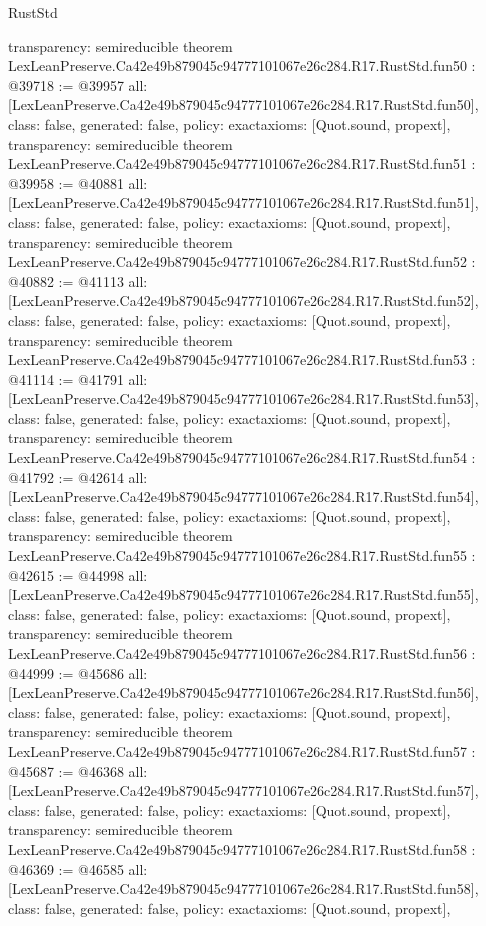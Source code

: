 \begin{lexlean}{RustStd}
\begin{coremodule}
{  transparency: semireducible
}
theorem LexLeanPreserve.Ca42e49b879045c94777101067e26c284.R17.RustStd.fun50 : @39718 := @39957 {
  all: [LexLeanPreserve.Ca42e49b879045c94777101067e26c284.R17.RustStd.fun50],
  class: false,
  generated: false,
  policy: exact{axioms: [Quot.sound, propext]},
  transparency: semireducible
}
theorem LexLeanPreserve.Ca42e49b879045c94777101067e26c284.R17.RustStd.fun51 : @39958 := @40881 {
  all: [LexLeanPreserve.Ca42e49b879045c94777101067e26c284.R17.RustStd.fun51],
  class: false,
  generated: false,
  policy: exact{axioms: [Quot.sound, propext]},
  transparency: semireducible
}
theorem LexLeanPreserve.Ca42e49b879045c94777101067e26c284.R17.RustStd.fun52 : @40882 := @41113 {
  all: [LexLeanPreserve.Ca42e49b879045c94777101067e26c284.R17.RustStd.fun52],
  class: false,
  generated: false,
  policy: exact{axioms: [Quot.sound, propext]},
  transparency: semireducible
}
theorem LexLeanPreserve.Ca42e49b879045c94777101067e26c284.R17.RustStd.fun53 : @41114 := @41791 {
  all: [LexLeanPreserve.Ca42e49b879045c94777101067e26c284.R17.RustStd.fun53],
  class: false,
  generated: false,
  policy: exact{axioms: [Quot.sound, propext]},
  transparency: semireducible
}
theorem LexLeanPreserve.Ca42e49b879045c94777101067e26c284.R17.RustStd.fun54 : @41792 := @42614 {
  all: [LexLeanPreserve.Ca42e49b879045c94777101067e26c284.R17.RustStd.fun54],
  class: false,
  generated: false,
  policy: exact{axioms: [Quot.sound, propext]},
  transparency: semireducible
}
theorem LexLeanPreserve.Ca42e49b879045c94777101067e26c284.R17.RustStd.fun55 : @42615 := @44998 {
  all: [LexLeanPreserve.Ca42e49b879045c94777101067e26c284.R17.RustStd.fun55],
  class: false,
  generated: false,
  policy: exact{axioms: [Quot.sound, propext]},
  transparency: semireducible
}
theorem LexLeanPreserve.Ca42e49b879045c94777101067e26c284.R17.RustStd.fun56 : @44999 := @45686 {
  all: [LexLeanPreserve.Ca42e49b879045c94777101067e26c284.R17.RustStd.fun56],
  class: false,
  generated: false,
  policy: exact{axioms: [Quot.sound, propext]},
  transparency: semireducible
}
theorem LexLeanPreserve.Ca42e49b879045c94777101067e26c284.R17.RustStd.fun57 : @45687 := @46368 {
  all: [LexLeanPreserve.Ca42e49b879045c94777101067e26c284.R17.RustStd.fun57],
  class: false,
  generated: false,
  policy: exact{axioms: [Quot.sound, propext]},
  transparency: semireducible
}
theorem LexLeanPreserve.Ca42e49b879045c94777101067e26c284.R17.RustStd.fun58 : @46369 := @46585 {
  all: [LexLeanPreserve.Ca42e49b879045c94777101067e26c284.R17.RustStd.fun58],
  class: false,
  generated: false,
  policy: exact{axioms: [Quot.sound, propext]},
}
\end{coremodule}
\end{lexlean}
